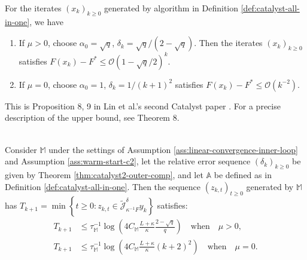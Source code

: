 \documentclass[12pt]{article}
\begin{document}
            \begin{theorem}\label{thm:catalyst2-outer-comp}
                For the iterates $(x_k)_{k \ge 0}$ generated by algorithm in Definition \ref{def:catalyst-all-in-one}, we have 
                \begin{enumerate}
                    \item If $\mu > 0$, choose $\alpha_0 = \sqrt{q}$, $\delta_k = \sqrt{q}/(2 - \sqrt{q})$. 
                    Then the iterates $(x_k)_{k \ge 0}$ satisfies $F(x_k) - F^* \le \mathcal O\left(1 - \sqrt{q}/2\right)^k$. 
                    \item If $\mu = 0$, choose $\alpha_0 = 1$, $\delta_k = 1/(k + 1)^2$ satisfies $F(x_k) - F^* \le \mathcal O(k^{-2})$. 
                \end{enumerate}
            \end{theorem}
            \begin{remark}
                This is Proposition 8, 9 in Lin et al.'s second Catalyst paper \cite{lin_catalyst_2018}.
                For a precise description of the upper bound, see Theorem 8. 
            \end{remark}
            \begin{theorem}\label{thm:inner-loop-comp-c2}\; \\
                Consider $\mathbb M$ under the settings of Assumption \ref{ass:linear-convergence-inner-loop} and Assumption \ref{ass:warm-start-c2}, let the relative error sequence $(\delta_k)_{k \ge0}$ be given by Theorem \ref{thm:catalyst2-outer-comp}, and let $\mathbb A$ be defined as in Definition \ref{def:catalyst-all-in-one}. 
                Then the sequence $(z_{k, t})_{t \ge 0}$ generated by $\mathbb M$ has $T_{k + 1} = \min\left\lbrace t \ge 0 : z_{k, t} \in \widetilde{\mathcal J}_{\kappa^{-1}F}^\delta y_k\right\rbrace$ satisfies: 
                \begin{align*}
                    T_{k + 1} &\le \tau_{\mathbb M}^{-1}
                    \log\left(
                        4 C_{\mathbb M}\frac{L + \kappa}{\kappa}\frac{2 - \sqrt{q}}{q}
                    \right) \quad \text{when}\quad \mu > 0, 
                    \\
                    T_{k + 1} &\le \tau_{\mathbb M}^{-1}
                    \log\left(
                        4 C_{\mathbb M}\frac{L + \kappa}{\kappa}(k + 2)^2
                    \right) \quad \text{when}\quad \mu = 0.  
                \end{align*}
            \end{theorem}
\end{document}
